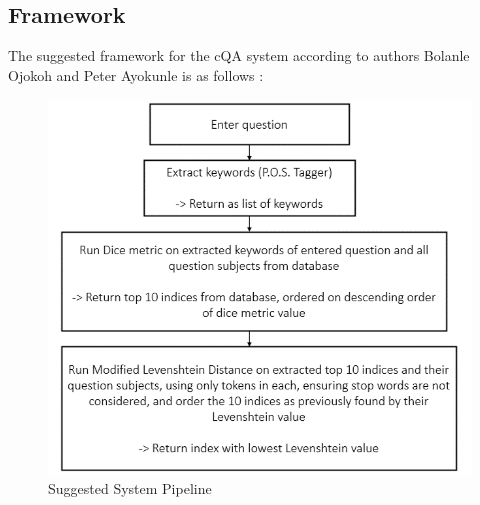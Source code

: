 \documentclass[12pt, a4paper]{article}
\begin{document}

\\~\\ 

\subsection{Framework} 

The suggested framework for the cQA system according to authors Bolanle Ojokoh and Peter Ayokunle is as follows : 

\clearpage
\begin{figure}[h]
    \includegraphics[scale=0.6]{suggested flowchart.png} 
    \centering 
    \caption{Suggested System Pipeline}
    \centering 
\end{figure} 
\end{document}
